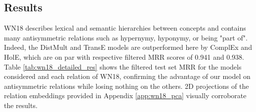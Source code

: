 \documentclass{article}
\begin{document}
\subsection{Results}


WN18 describes lexical and semantic hierarchies between concepts and contains many antisymmetric relations such as hypernymy, hyponymy, or being "part of". Indeed, the DistMult and TransE models are outperformed here by ComplEx and HolE, which are on par with respective filtered MRR scores of 0.941 and 0.938. Table \ref{tab:wn18_detailed_res} shows the filtered test set MRR for the models considered and each relation of WN18, confirming the advantage of our model on antisymmetric relations while losing nothing on the others. 2D projections of the relation embeddings provided in Appendix \ref{app:wn18_pca} visually corroborate the results.
\end{document}
